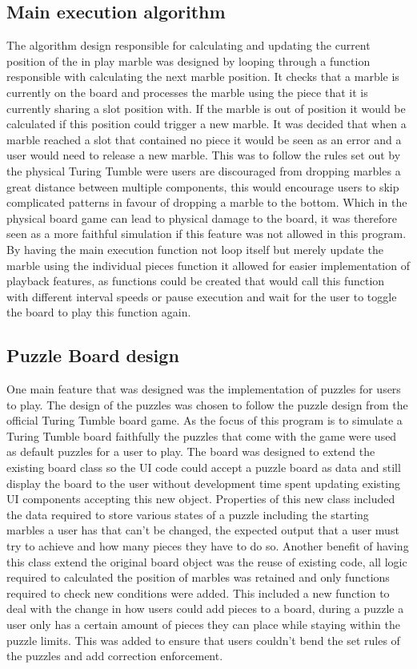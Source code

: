 \documentclass{l4proj}
\begin{document}
\subsection{Main execution algorithm}
The algorithm design responsible for calculating and updating the current position of the in play marble was designed by looping through a function responsible with calculating the next marble position. It checks that a marble is currently on the board and processes the marble using the piece that it is currently sharing a slot position with. If the marble is out of position it would be calculated if this position could trigger a new marble. It was decided that when a marble reached a slot that contained no piece it would be seen as an error and a user would need to release a new marble. This was to follow the rules set out by the physical Turing Tumble were users are discouraged from dropping marbles a great distance between multiple components, this would encourage users to skip complicated patterns in favour of dropping a marble to the bottom. Which in the physical board game can lead to physical damage to the board, it was therefore seen as a more faithful simulation if this feature was not allowed in this program. By having the main execution function not loop itself but merely update the marble using the individual pieces function it allowed for easier implementation of playback features, as functions could be created that would call this function with different interval speeds or pause execution and wait for the user to toggle the board to play this function again.

\subsection{Puzzle Board design}
One main feature that was designed was the implementation of puzzles for users to play. The design of the puzzles was chosen to follow the puzzle design from the official Turing Tumble board game. As the focus of this program is to simulate a Turing Tumble board faithfully the puzzles that come with the game were used as default puzzles for a user to play. The board was designed to extend the existing board class so the UI code could accept a puzzle board as data and still display the board to the user without development time spent updating existing UI components accepting this new object. Properties of this new class included the data required to store various states of a puzzle including the starting marbles a user has that can't be changed, the expected output that a user must try to achieve and how many pieces they have to do so. Another benefit of having this class extend the original board object was the reuse of existing code, all logic required to calculated the position of marbles was retained and only functions required to check new conditions were added. This included a new function to deal with the change in how users could add pieces to a board, during a puzzle a user only has a certain amount of pieces they can place while staying within the puzzle limits. This was added to ensure that users couldn't bend the set rules of the puzzles and add correction enforcement.   
\end{document}
